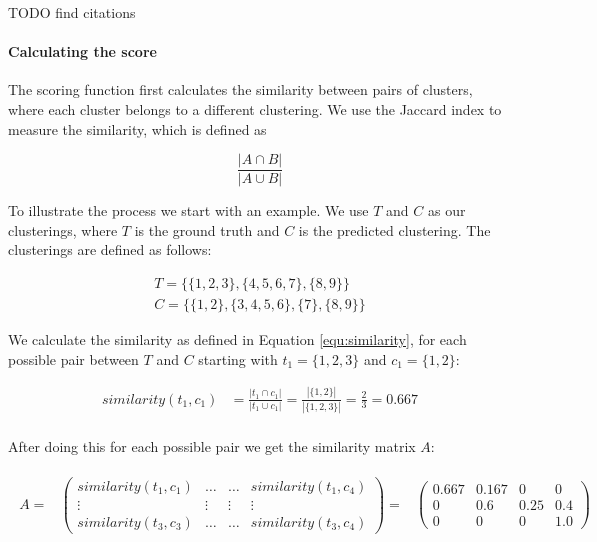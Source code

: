 TODO find citations

\paragraph{Calculating the score}

The scoring function first calculates the similarity between pairs of clusters, where each cluster belongs to a different clustering. We use the Jaccard index to measure the similarity, which is defined as

\begin{equation}
    \label{equ:similarity}
    \frac{|A \cap B|}{|A \cup B|}
\end{equation}

To illustrate the process we start with an example. We use $T$ and $C$ as our clusterings, where $T$ is the ground truth and $C$ is the predicted clustering. The clusterings are defined as follows:

\begin{gather*}
    T = \{\{1,2,3\},\{4,5,6,7\},\{8,9\}\} \\
    C = \{\{1,2\},\{3,4,5,6\},\{7\},\{8,9\}\}
\end{gather*}

We calculate the similarity as defined in Equation \ref{equ:similarity}, for each possible pair between $T$ and $C$ starting with $t_1= \{1,2,3\}$ and $c_1 = \{1,2\}$:

\begin{align*}
    similarity(t_1,c_1) &=\frac{|t_1 \cap c_1|}{|t_1 \cup c_1|}
    = \frac{|\{1,2\}|}{|\{1,2,3\}|}
    = \frac{2}{3} = 0.667 \\
\end{align*}

After doing this for each possible pair we get the similarity matrix $A$:

\begin{gather*}
\begin{array}{rcl}
    A = & \left(\begin{array}{cccc}
        similarity(t_1,c_1) & \hdots & \hdots & similarity(t_1,c_4)\\
        \vdots & \vdots & \vdots & \vdots\\
        similarity(t_3,c_3) & \hdots & \hdots & similarity(t_3,c_4) \end{array}\right)
        = & \left(\begin{array}{cccc}
            0.667 & 0.167 & 0 & 0 \\
            0 & 0.6 & 0.25 & 0.4 \\
            0 &  0 & 0 & 1.0 \end{array}\right)
\end{array}
\end{gather*}

